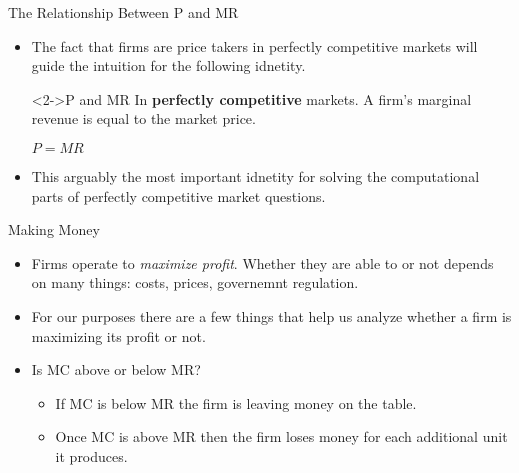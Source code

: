 \documentclass[aspectratio=169]{beamer}
\begin{document}
\begin{frame}{The Relationship Between P and MR}
    \begin{itemize}
        \item The fact that firms are price takers in perfectly competitive markets will guide the intuition for the following idnetity.
        \begin{block}<2->{P and MR}
            In \textbf{perfectly competitive} markets. A firm's marginal revenue is equal to the market price. \\
            \vspace{2mm}
            \begin{center}
                $P = MR$\\
            \end{center}
        \end{block}
        \item This arguably the most important idnetity for solving the computational parts of perfectly competitive market questions. 
    \end{itemize}
\end{frame}

\begin{frame}{Making Money}
    \begin{itemize}
        \item Firms operate to \textit{maximize profit}. Whether they are able to or not depends on many things: costs, prices, governemnt regulation.
        \item For our purposes there are a few things that help us analyze whether a firm is maximizing its profit or not.
        \item<2-> Is MC above or below MR?
        \begin{itemize}
            \item<3-> If MC is below MR the firm is leaving money on the table.
            \item<4-> Once MC is above MR then the firm loses money for each additional unit it produces.
        \end{itemize}
    \end{itemize}
\end{frame}
\end{document}
